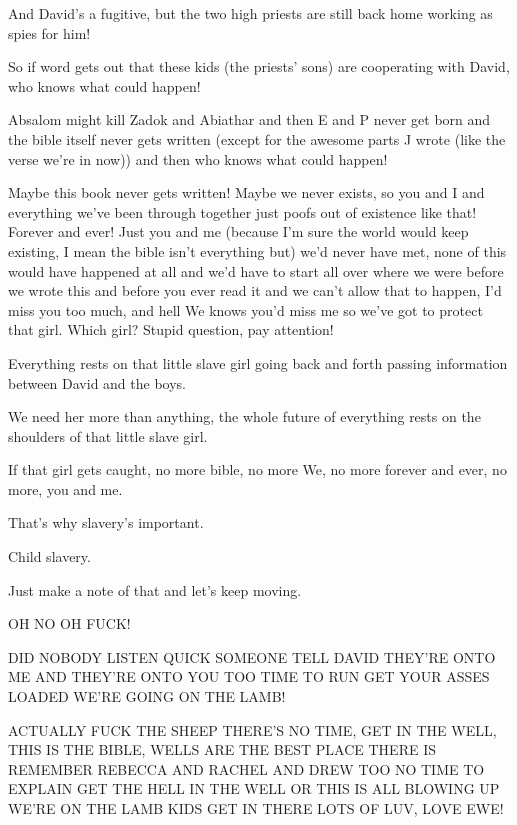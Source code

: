 {	And David's a fugitive, but the two high priests are still back home working
	as spies for him!

	So if word gets out that these kids (the priests' sons) are cooperating with
	David, who knows what could happen!

	Absalom might kill Zadok and Abiathar and then E and P never get born and
	the bible itself never gets written (except for the awesome parts J wrote
	(like the verse we're in now)) and then who knows what could happen!

	Maybe this book never gets written! Maybe we never exists, so you and I and
	everything we've been through together just poofs out of existence like
	that! Forever and ever! Just you and me (because I'm sure the world would
	keep existing, I mean the bible isn't everything but) we'd never have met,
	none of this would have happened at all and we'd have to start all over
	where we were before we wrote this and before you ever read it and we can't
	allow that to happen, I'd miss you too much, and hell We knows you'd miss me
	so we've got to protect that girl. Which girl? Stupid question, pay
	attention!

	Everything rests on that little slave girl going back and forth passing
	information between David and the boys.

	We need her more than anything, the whole future of everything rests on the
	shoulders of that little slave girl.

	If that girl gets caught, no more bible, no more We, no more forever and
	ever, no more, you and me.

	That's why slavery's important.

	Child slavery.

	Just make a note of that and let's keep moving.
}

{
}
{
}
{
	OH NO OH FUCK!

	DID NOBODY LISTEN QUICK SOMEONE TELL  DAVID  THEY'RE ONTO
	ME AND THEY'RE ONTO YOU TOO TIME TO RUN GET YOUR ASSES LOADED WE'RE GOING ON
	THE LAMB!

	ACTUALLY FUCK THE SHEEP THERE'S NO TIME, GET IN THE WELL, THIS IS THE BIBLE,
	WELLS ARE THE BEST PLACE THERE IS REMEMBER REBECCA AND RACHEL AND DREW TOO
	NO TIME TO EXPLAIN GET THE HELL IN THE WELL OR THIS IS ALL BLOWING UP WE'RE
	ON THE LAMB KIDS GET IN THERE LOTS OF LUV, LOVE EWE!
}

